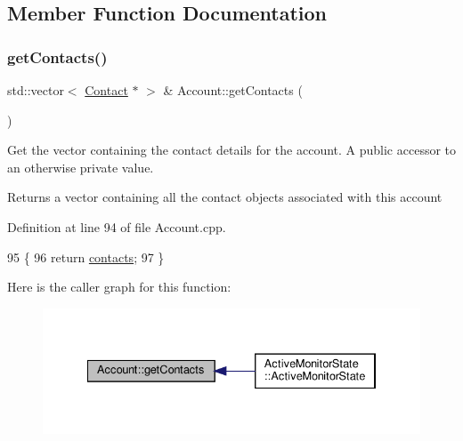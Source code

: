 \subsection{Member Function Documentation}
\mbox{\label{class_account_a53a9e366a589538552a368e3bbac2fd3}} 
\subsubsection{\texorpdfstring{get\+Contacts()}{getContacts()}}
{\footnotesize\ttfamily std\+::vector$<$ \hyperlink{class_contact}{Contact} $\ast$ $>$ \& Account\+::get\+Contacts (\begin{DoxyParamCaption}{ }\end{DoxyParamCaption})}

Get the vector containing the contact details for the account. A public accessor to an otherwise private value.

\begin{DoxyReturn}{Returns}
a vector containing all the contact objects associated with this account 
\end{DoxyReturn}


Definition at line 94 of file Account.\+cpp.


\begin{DoxyCode}
95 \{
96     \textcolor{keywordflow}{return} \hyperlink{class_account_aa4f77abd7c44f2a70b0cff8088e3491f}{contacts};
97 \}
\end{DoxyCode}
Here is the caller graph for this function\+:
\nopagebreak
\begin{figure}[H]
\begin{center}
\leavevmode
\includegraphics[width=334pt]{db/d22/class_account_a53a9e366a589538552a368e3bbac2fd3_icgraph}
\end{center}
\end{figure}
\mbox{\label{class_account_a5117acc0c4ef7be21c5339bd9ae84e40}} 
